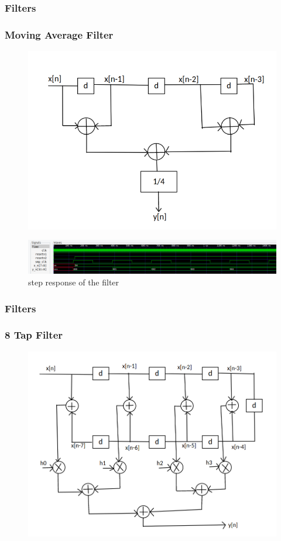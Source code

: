 \documentclass{beamer}
\begin{document}
\begin{frame}
	\frametitle{Filters}
	\frametitle{Moving Average Filter}
		\begin{figure}[h!]
  		\centering
    			\includegraphics[width=0.5\linewidth]{./figs/mov.png}
		\end{figure}	
		\begin{figure}[h!]
  		\centering
    			\includegraphics[width=\linewidth]{./figs/movavg.png}
		\caption{step response of the filter}
		\end{figure}	

\end{frame}

\begin{frame}
	\frametitle{Filters}
	\frametitle{8 Tap Filter}
		\begin{figure}[h!]
  		\centering
    			\includegraphics[width=0.7\linewidth]{./figs/tap_8.png}
		\end{figure}	

\end{frame}
\end{document}
